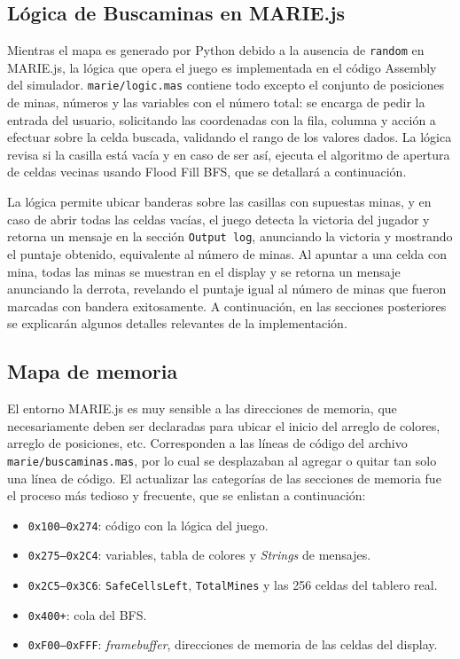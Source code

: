 \documentclass[conference]{IEEEtran}
\begin{document}
\subsection{Lógica de Buscaminas en MARIE.js}

Mientras el mapa es generado por Python debido a la ausencia de \texttt{random} en MARIE.js, la lógica que opera el juego es implementada en el código Assembly del simulador. \texttt{marie/logic.mas} contiene todo excepto el conjunto de posiciones de minas, números y las variables con el número total: se encarga de pedir la entrada del usuario, solicitando las coordenadas con la fila, columna y acción a efectuar sobre la celda buscada, validando el rango de los valores dados. La lógica revisa si la casilla está vacía y en caso de ser así, ejecuta el algoritmo de apertura de celdas vecinas usando Flood Fill BFS, que se detallará a continuación. 

La lógica permite ubicar banderas sobre las casillas con supuestas minas, y en caso de abrir todas las celdas vacías, el juego detecta la victoria del jugador y retorna un mensaje en la sección \texttt{Output log}, anunciando la victoria y mostrando el puntaje obtenido, equivalente al número de minas. Al apuntar a una celda con mina, todas las minas se muestran en el display y se retorna un mensaje anunciando la derrota, revelando el puntaje igual al número de minas que fueron marcadas con bandera exitosamente. A continuación, en las secciones posteriores se explicarán algunos detalles relevantes de la implementación.

\subsection{Mapa de memoria}
El entorno MARIE.js es muy sensible a las direcciones de memoria, que necesariamente deben ser declaradas para ubicar el inicio del arreglo de colores, arreglo de posiciones, etc. Corresponden a las líneas de código del archivo \texttt{marie/buscaminas.mas}, por lo cual se desplazaban al agregar o quitar tan solo una línea de código. El actualizar las categorías de las secciones de memoria fue el proceso más tedioso y frecuente, que se enlistan a continuación:

\begin{itemize}
  \item \texttt{0x100--0x274}: código con la lógica del juego.
  \item \texttt{0x275--0x2C4}: variables, tabla de colores y \textit{Strings} de mensajes.
  \item \texttt{0x2C5--0x3C6}: \texttt{SafeCellsLeft}, \texttt{TotalMines} y las 256 celdas del tablero real.
  \item \texttt{0x400+}: cola del BFS.
  \item \texttt{0xF00--0xFFF}: \textit{framebuffer}, direcciones de memoria de las celdas del display.
\end{itemize}
\end{document}
